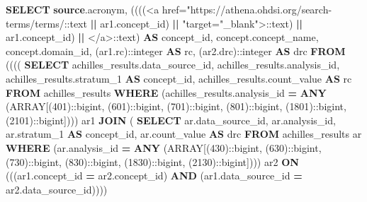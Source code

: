 \documentclass[
]{book}
\newenvironment{Shaded}{\begin{snugshade}}{\end{snugshade}}
\newcommand{\CharTok}[1]{\textcolor[rgb]{0.31,0.60,0.02}{#1}}
\newcommand{\DataTypeTok}[1]{\textcolor[rgb]{0.13,0.29,0.53}{#1}}
\newcommand{\DecValTok}[1]{\textcolor[rgb]{0.00,0.00,0.81}{#1}}
\newcommand{\KeywordTok}[1]{\textcolor[rgb]{0.13,0.29,0.53}{\textbf{#1}}}
\newcommand{\NormalTok}[1]{#1}
\newcommand{\OperatorTok}[1]{\textcolor[rgb]{0.81,0.36,0.00}{\textbf{#1}}}
\newcommand{\StringTok}[1]{\textcolor[rgb]{0.31,0.60,0.02}{#1}}
\begin{document}
\begin{Shaded}
\begin{Highlighting}[]
\KeywordTok{SELECT}
   \KeywordTok{source}\NormalTok{.acronym,}
\NormalTok{   ((((}\StringTok{\textquotesingle{}\textless{}a href="https://athena.ohdsi.org/search{-}terms/terms/\textquotesingle{}}\NormalTok{:}\CharTok{:text} \OperatorTok{||}\NormalTok{ ar1.concept\_id) }\OperatorTok{||} \StringTok{\textquotesingle{}"target="\_blank"\textgreater{}\textquotesingle{}}\NormalTok{:}\CharTok{:text}\NormalTok{) }\OperatorTok{||}\NormalTok{ ar1.concept\_id) }\OperatorTok{||} \StringTok{\textquotesingle{}\textless{}/a\textgreater{}\textquotesingle{}}\NormalTok{:}\CharTok{:text}\NormalTok{) }\KeywordTok{AS}\NormalTok{ concept\_id,}
\NormalTok{   concept.concept\_name,}
\NormalTok{   concept.domain\_id,}
\NormalTok{   (ar1.rc):}\CharTok{:integer} \KeywordTok{AS}\NormalTok{ rc,}
\NormalTok{   (ar2.drc):}\CharTok{:integer} \KeywordTok{AS}\NormalTok{ drc}
  \KeywordTok{FROM}\NormalTok{ (((( }\KeywordTok{SELECT}\NormalTok{ achilles\_results.data\_source\_id,}
\NormalTok{           achilles\_results.analysis\_id,}
\NormalTok{           achilles\_results.stratum\_1 }\KeywordTok{AS}\NormalTok{ concept\_id,}
\NormalTok{           achilles\_results.count\_value }\KeywordTok{AS}\NormalTok{ rc}
          \KeywordTok{FROM}\NormalTok{ achilles\_results}
         \KeywordTok{WHERE}\NormalTok{ (achilles\_results.analysis\_id }\OperatorTok{=} \KeywordTok{ANY}\NormalTok{ (}\DataTypeTok{ARRAY}\NormalTok{[(}\DecValTok{401}\NormalTok{):}\CharTok{:bigint}\NormalTok{, (}\DecValTok{601}\NormalTok{):}\CharTok{:bigint}\NormalTok{, (}\DecValTok{701}\NormalTok{):}\CharTok{:bigint}\NormalTok{, (}\DecValTok{801}\NormalTok{):}\CharTok{:bigint}\NormalTok{, (}\DecValTok{1801}\NormalTok{):}\CharTok{:bigint}\NormalTok{, (}\DecValTok{2101}\NormalTok{):}\CharTok{:bigint}\NormalTok{]))) ar1}
    \KeywordTok{JOIN}\NormalTok{ ( }\KeywordTok{SELECT}\NormalTok{ ar.data\_source\_id,}
\NormalTok{           ar.analysis\_id,}
\NormalTok{           ar.stratum\_1 }\KeywordTok{AS}\NormalTok{ concept\_id,}
\NormalTok{           ar.count\_value }\KeywordTok{AS}\NormalTok{ drc}
          \KeywordTok{FROM}\NormalTok{ achilles\_results ar}
         \KeywordTok{WHERE}\NormalTok{ (ar.analysis\_id }\OperatorTok{=} \KeywordTok{ANY}\NormalTok{ (}\DataTypeTok{ARRAY}\NormalTok{[(}\DecValTok{430}\NormalTok{):}\CharTok{:bigint}\NormalTok{, (}\DecValTok{630}\NormalTok{):}\CharTok{:bigint}\NormalTok{, (}\DecValTok{730}\NormalTok{):}\CharTok{:bigint}\NormalTok{, (}\DecValTok{830}\NormalTok{):}\CharTok{:bigint}\NormalTok{, (}\DecValTok{1830}\NormalTok{):}\CharTok{:bigint}\NormalTok{, (}\DecValTok{2130}\NormalTok{):}\CharTok{:bigint}\NormalTok{]))) ar2 }\KeywordTok{ON}\NormalTok{ (((ar1.concept\_id }\OperatorTok{=}\NormalTok{ ar2.concept\_id) }\KeywordTok{AND}\NormalTok{ (ar1.data\_source\_id }\OperatorTok{=}\NormalTok{ ar2.data\_source\_id))))}

\end{Highlighting}
\end{Shaded}
\end{document}
